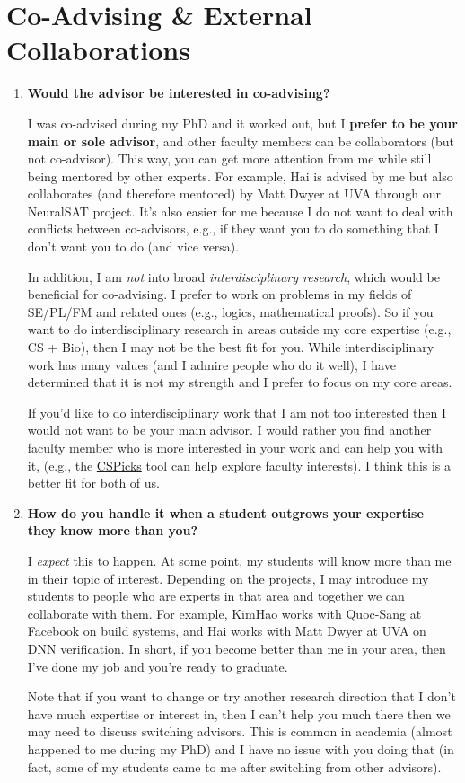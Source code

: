 \documentclass{article}
\begin{document}
\section{Co-Advising \& External Collaborations}

\begin{enumerate}[label=\arabic*.]
    \item \textbf{Would the advisor be interested in co-advising?}  
    
    I was co-advised during my PhD and it worked out, but I \textbf{prefer to be your main or sole advisor}, and other faculty members can be collaborators (but not co-advisor). This way, you can get more attention from me while still being mentored by other experts. For example, Hai is advised by me but also collaborates (and therefore mentored) by Matt Dwyer at UVA through our NeuralSAT project. It's also easier for me because I do not want to deal with conflicts between co-advisors, e.g., if they want you to do something that I don't want you to do (and vice versa).

    In addition, I am \emph{not} into broad \emph{interdisciplinary research}, which would be beneficial for co-advising. I prefer to work on problems in my fields of SE/PL/FM and related ones (e.g., logics, mathematical proofs). So if you want to do interdisciplinary research in areas outside my core expertise (e.g., CS + Bio), then I may not be the best fit for you. While interdisciplinary work has many values (and I admire people who do it well), I have determined that it is not my strength and I prefer to focus on my core areas.

    If you'd like to do interdisciplinary work that I am not too interested then I would not want to be your main advisor. I would rather you find another faculty member who is more interested in your work and can help you with it, (e.g., the \href{https://roars.dev/cspicks}{CSPicks} tool can help explore faculty interests). I think this is a better fit for both of us.

    \item \textbf{How do you handle it when a student outgrows your expertise — they know more than you?}  
    
    I \emph{expect} this to happen. At some point, my students will know more than me in their topic of interest. Depending on the projects, I may introduce my students to people who are experts in that area and together we can collaborate with them. For example, KimHao works with Quoc-Sang at Facebook on build systems, and Hai works with Matt Dwyer at UVA on DNN verification. In short, if you become better than me in your area, then I've done my job and you're ready to graduate.  
    
    Note that if you want to change or try another research direction that I don't have much expertise or interest in, then I can't help you much there then we may need to discuss switching advisors. This is common in academia (almost happened to me during my PhD) and I have no issue with you doing that (in fact, some of my students came to me after switching from other advisors).

\end{enumerate}
\end{document}

